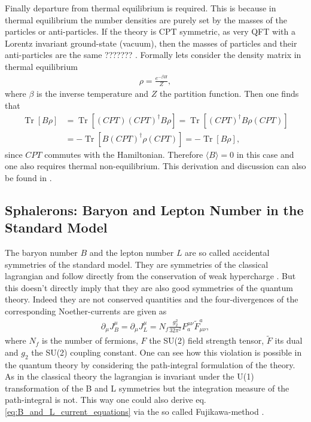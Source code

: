 \documentclass[13pt,a4paper,twoside,titlepage]{article}
\newcommand{\Tr}{\operatorname{Tr}}
\begin{document}
Finally departure from thermal equilibrium is required. This is because in thermal equilibrium the number densities are purely set by the
masses of the particles or anti-particles. If the theory is CPT symmetric, as very QFT with a Lorentz invariant ground-state (vacuum), then the
masses of particles and their anti-particles are the same ??????? .
Formally lets consider the density matrix in thermal equilibrium
\begin{align}
    \rho = \frac{e^{- \beta H}}{Z},
\end{align}
where $\beta$ is the inverse temperature and $Z$ the partition function.
Then one finds that
\begin{align}
    \Tr [ B \rho ] &=  \Tr [ (CPT) (CPT)^\dagger B \rho ] = \Tr [ (CPT)^\dagger B \rho (CPT) ]  \\
                   &= - \Tr [ B (CPT)^\dagger \rho (CPT) ] = - \Tr [ B \rho ],
\end{align}
since $CPT$ commutes with the Hamiltonian. Therefore $\langle B \rangle = 0$ in this case and one also requires thermal non-equilibrium. This derivation and discussion can also be found in \cite[sec. II]{Trodden:2004mj_baryogenesis_and_leptogenesis}.


\subsection{Sphalerons: Baryon and Lepton Number in the Standard Model}
The baryon number $B$ and the lepton number $L$ are so called accidental
symmetries of the standard model. They are symmetries of the classical lagrangian
and follow directly from the conservation of weak hypercharge \cite[part II.B]{Trodden:2004mj_baryogenesis_and_leptogenesis}.
But this doesn't directly imply that they are also good symmetries of the
quantum theory. Indeed they are not conserved quantities and the four-divergences
of the corresponding Noether-currents are given as \cite[eq. 2.1]{Cline:2006ts_Baryogenesis}
\begin{align}
    \label{eq:B_and_L_current_equations}
    \partial_\mu J^\mu_B = \partial_\mu J^\mu_L = N_f \frac{g_2^2}{32 \pi^2} F^{\mu \nu}_a \tilde{F}_{\mu \nu}^a,
\end{align}
where $N_f$ is the number of fermions, $F$ the SU(2) field strength tensor, $\tilde{F}$ its dual and $g_2$ the SU(2) coupling constant.
One can see how this violation is possible in the quantum theory by considering the path-integral formulation of the theory.
As in the classical theory the lagrangian is invariant under the U(1) transformation of the B and L symmetries but the integration measure of the path-integral is not. This way one could also derive eq. \eqref{eq:B_and_L_current_equations} via the so called Fujikawa-method \cite{Fujikawa_method_PhysRevD.21.2848}.
\end{document}

